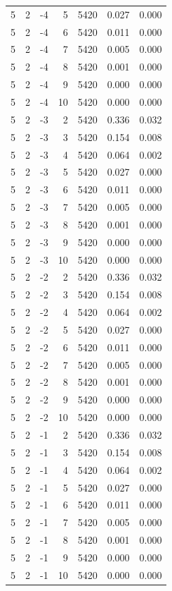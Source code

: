 \begin{table}
\begin{tabular}{rrrrrrr}
5 & 2 & -4 & 5 & 5420 & 0.027 & 0.000 \\
5 & 2 & -4 & 6 & 5420 & 0.011 & 0.000 \\
5 & 2 & -4 & 7 & 5420 & 0.005 & 0.000 \\
5 & 2 & -4 & 8 & 5420 & 0.001 & 0.000 \\
5 & 2 & -4 & 9 & 5420 & 0.000 & 0.000 \\
5 & 2 & -4 & 10 & 5420 & 0.000 & 0.000 \\
5 & 2 & -3 & 2 & 5420 & 0.336 & 0.032 \\
5 & 2 & -3 & 3 & 5420 & 0.154 & 0.008 \\
5 & 2 & -3 & 4 & 5420 & 0.064 & 0.002 \\
5 & 2 & -3 & 5 & 5420 & 0.027 & 0.000 \\
5 & 2 & -3 & 6 & 5420 & 0.011 & 0.000 \\
5 & 2 & -3 & 7 & 5420 & 0.005 & 0.000 \\
5 & 2 & -3 & 8 & 5420 & 0.001 & 0.000 \\
5 & 2 & -3 & 9 & 5420 & 0.000 & 0.000 \\
5 & 2 & -3 & 10 & 5420 & 0.000 & 0.000 \\
5 & 2 & -2 & 2 & 5420 & 0.336 & 0.032 \\
5 & 2 & -2 & 3 & 5420 & 0.154 & 0.008 \\
5 & 2 & -2 & 4 & 5420 & 0.064 & 0.002 \\
5 & 2 & -2 & 5 & 5420 & 0.027 & 0.000 \\
5 & 2 & -2 & 6 & 5420 & 0.011 & 0.000 \\
5 & 2 & -2 & 7 & 5420 & 0.005 & 0.000 \\
5 & 2 & -2 & 8 & 5420 & 0.001 & 0.000 \\
5 & 2 & -2 & 9 & 5420 & 0.000 & 0.000 \\
5 & 2 & -2 & 10 & 5420 & 0.000 & 0.000 \\
5 & 2 & -1 & 2 & 5420 & 0.336 & 0.032 \\
5 & 2 & -1 & 3 & 5420 & 0.154 & 0.008 \\
5 & 2 & -1 & 4 & 5420 & 0.064 & 0.002 \\
5 & 2 & -1 & 5 & 5420 & 0.027 & 0.000 \\
5 & 2 & -1 & 6 & 5420 & 0.011 & 0.000 \\
5 & 2 & -1 & 7 & 5420 & 0.005 & 0.000 \\
5 & 2 & -1 & 8 & 5420 & 0.001 & 0.000 \\
5 & 2 & -1 & 9 & 5420 & 0.000 & 0.000 \\
5 & 2 & -1 & 10 & 5420 & 0.000 & 0.000 \\

\end{tabular}
\end{table}

